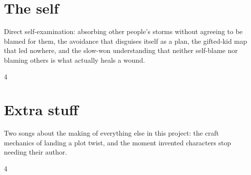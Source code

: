 \documentclass[a4paper,landscape]{memoir}
\begin{document}
\chapter{The self}
Direct self-examination: absorbing other people's storms without agreeing to be blamed for them, the avoidance that disguises itself as a plan, the gifted-kid map that led nowhere, and the slow-won understanding that neither self-blame nor blaming others is what actually heals a wound.
\clearpage\begin{multicols*}{4}













% 
% 
% 
% 
% 
% 
% 





\end{multicols*}

\chapter{Extra stuff}
Two songs about the making of everything else in this project: the craft mechanics of landing a plot twist, and the moment invented characters stop needing their author.
\clearpage\begin{multicols*}{4}


\end{multicols*}

\appendix

\backmatter
\printindex[songs]
\clearpage
\printindex[tags]
\end{document}
